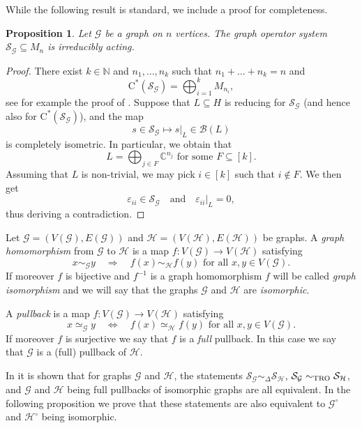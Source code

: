 \documentclass[11pt]{amsart}
\numberwithin{equation}{section}
\theoremstyle{plain}
\newtheorem{proposition}[theorem]{Proposition}
\theoremstyle{definition}
\theoremstyle{remark}
\newcommand{\B}{{\mathcal{B}}}
\newcommand{\G}{{\mathcal{G}}}
\renewcommand{\H}{{\mathcal{H}}}
\renewcommand{\S}{{\mathcal{S}}}
\newcommand{\eps}{\varepsilon}
\def\De{\Delta}
\newcommand{\bC}{\mathbb{C}}
\newcommand{\bN}{\mathbb{N}}
\newcommand{\foral}{\text{ for all }}
\newcommand{\qand}{\quad\text{and}\quad}
\newcommand{\ca}{\mathrm{C}^*}
\begin{document}
While the following result is standard, we include a proof for completeness.

\begin{proposition}\label{P:irrgra}
Let $\G$ be a graph on $n$ vertices. The graph operator system $\S_\G\subseteq M_n$ is irreducibly acting. 
\end{proposition}

\begin{proof}
There exist $k\in \bN$ and $n_1,\dots, n_k$ such that $n_1+\dots + n_k=n$ and
\[
\ca(\S_\G)= \bigoplus_{i=1}^k M_{n_i},
\]
see for example the proof of \cite[Theorem 3.2]{OP14}. Suppose that $L\subseteq H$ is reducing for $\S_\G$ (and hence also for $\ca(\S_{\G})$), and the map
\[
s\in \S_\G \mapsto s|_L\in \B(L)
\]
is completely isometric.
In particular, we obtain that
\[
L=\bigoplus_{j\in F} \bC^{n_j} \text{ for some } F\subseteq [k].
\]
Assuming that $L$ is non-trivial, we may pick $i\in [k]$ such that $i\not \in F$. We then get 
\[
\eps_{ii}\in \S_\G\qand \eps_{ii}|_L=0,
\]
thus deriving a contradiction.
\end{proof}

Let $\G = (V(\G), E(\G)) $ and $\H = (V(\H), E(\H)) $ be graphs.  A \emph{graph homomorphism} from  $\G$  to  $\H$  is a map $f \colon V(\G) \to V(\H)$
satisfying
\[
x \sim_{\G} y \quad \Rightarrow\quad f(x) \sim_{\H} f(y) \foral x,y \in V(\G).
\]
If moreover $f$ is bijective and $f^{-1}$ is a graph homomorphism $f$ will be called \emph{graph isomorphism} and we will say that the graphs $\G$ and $\H$ are \emph{isomorphic}.
 
A \emph{pullback} is a map $f\colon V(\G) \to V(\H)$ satisfying
\[
x\simeq_{\G} y \quad \Leftrightarrow \quad f(x) \simeq_{\H} f(y)
 \foral x,y \in V(\G).
\]
If moreover $f$ is surjective we say that $ f$ is a \emph{full} pullback. In this case we say that $\G$ is a (full) pullback of $\H$.

In \cite[Corollary 7.6]{EKT21} it is shown that for graphs $\G$ and $\H$, the statements $\S_{\G} \sim_{\De} \S_{\H}$, $\S_{\G} \sim_{\rm TRO} \S_{\H}$, and $\G$ and $\H$ being full pullbacks of isomorphic graphs are all equivalent. In the following proposition we prove that these statements are also equivalent to $\G^\circ$ and $\H^\circ$ being isomorphic. 
\end{document}
